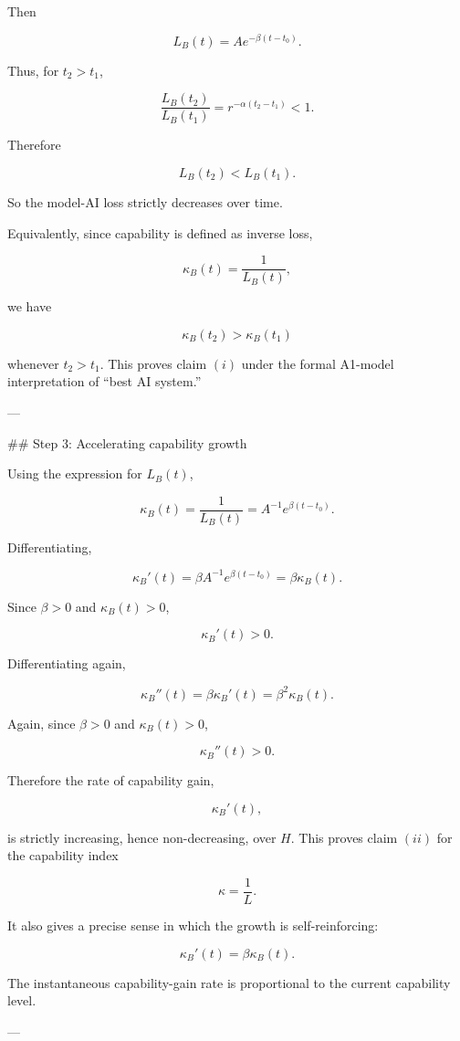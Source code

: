Then

\[
L_B(t)=Ae^{-\beta(t-t_0)}.
\]

Thus, for \(t_2>t_1\),

\[
\frac{L_B(t_2)}{L_B(t_1)}
=
r^{-\alpha(t_2-t_1)}
<1.
\]

Therefore

\[
L_B(t_2)<L_B(t_1).
\]

So the model-AI loss strictly decreases over time.

Equivalently, since capability is defined as inverse loss,

\[
\kappa_B(t)=\frac{1}{L_B(t)},
\]

we have

\[
\kappa_B(t_2)>\kappa_B(t_1)
\]

whenever \(t_2>t_1\). This proves claim \((i)\) under the formal A1-model interpretation of “best AI system.”

---

## Step 3: Accelerating capability growth

Using the expression for \(L_B(t)\),

\[
\kappa_B(t)
=
\frac{1}{L_B(t)}
=
A^{-1}e^{\beta(t-t_0)}.
\]

Differentiating,

\[
\kappa_B'(t)
=
\beta A^{-1}e^{\beta(t-t_0)}
=
\beta \kappa_B(t).
\]

Since \(\beta>0\) and \(\kappa_B(t)>0\),

\[
\kappa_B'(t)>0.
\]

Differentiating again,

\[
\kappa_B''(t)
=
\beta \kappa_B'(t)
=
\beta^2\kappa_B(t).
\]

Again, since \(\beta>0\) and \(\kappa_B(t)>0\),

\[
\kappa_B''(t)>0.
\]

Therefore the rate of capability gain,

\[
\kappa_B'(t),
\]

is strictly increasing, hence non-decreasing, over \(H\). This proves claim \((ii)\) for the capability index

\[
\kappa=\frac{1}{L}.
\]

It also gives a precise sense in which the growth is self-reinforcing:

\[
\kappa_B'(t)=\beta \kappa_B(t).
\]

The instantaneous capability-gain rate is proportional to the current capability level.

---

